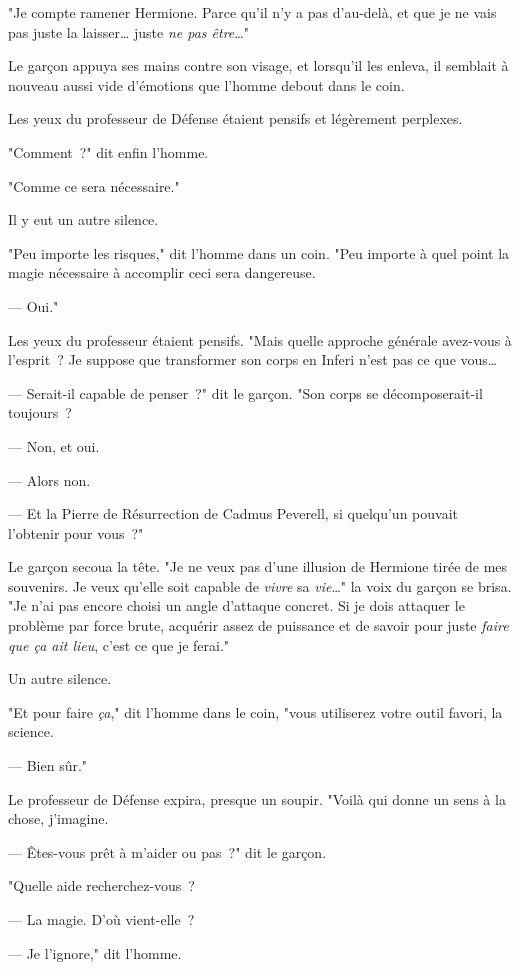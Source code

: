 "Je compte ramener Hermione. Parce qu'il n'y a pas d'au-delà, et que je ne vais pas juste la laisser… juste \emph{ne pas être}…"

Le garçon appuya ses mains contre son visage, et lorsqu'il les enleva, il semblait à nouveau aussi vide d'émotions que l'homme debout dans le coin.

Les yeux du professeur de Défense étaient pensifs et légèrement perplexes.

"Comment~?" dit enfin l'homme.

"Comme ce sera nécessaire."

Il y eut un autre silence.

"Peu importe les risques," dit l'homme dans un coin. "Peu importe à quel point la magie nécessaire à accomplir ceci sera dangereuse.

--- Oui."

Les yeux du professeur étaient pensifs. "Mais quelle approche générale avez-vous à l'esprit~? Je suppose que transformer son corps en Inferi n'est pas ce que vous…

--- Serait-il capable de penser~?" dit le garçon. "Son corps se décomposerait-il toujours~?

--- Non, et oui.

--- Alors non.

--- Et la Pierre de Résurrection de Cadmus Peverell, si quelqu'un pouvait l'obtenir pour vous~?"

Le garçon secoua la tête. "Je ne veux pas d'une illusion de Hermione tirée de mes souvenirs. Je veux qu'elle soit capable de \emph{vivre} sa \emph{vie}…" la voix du garçon se brisa. "Je n'ai pas encore choisi un angle d'attaque concret. Si je dois attaquer le problème par force brute, acquérir assez de puissance et de savoir pour juste \emph{faire que ça ait lieu}, c'est ce que je ferai."

Un autre silence.

"Et pour faire \emph{ça}," dit l'homme dans le coin, "vous utiliserez votre outil favori, la science.

--- Bien sûr."

Le professeur de Défense expira, presque un soupir. "Voilà qui donne un sens à la chose, j'imagine.

--- Êtes-vous prêt à m'aider ou pas~?" dit le garçon.

"Quelle aide recherchez-vous~?

--- La magie. D'où vient-elle~?

--- Je l'ignore," dit l'homme.

